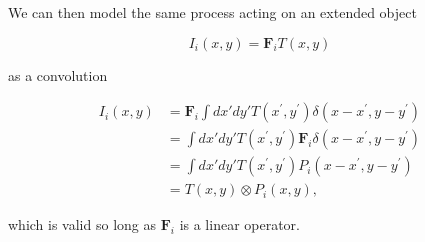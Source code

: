 \documentclass{openjournal}
\begin{document}
We can then model the same process acting on an extended object
\begin{linenomath}\begin{equation}
    I_i(x,y) = \mathbf{F}_i T(x,y)
\end{equation}\end{linenomath}
as a convolution
\begin{linenomath}\begin{align}
    I_i(x,y) &= \mathbf{F}_i \int dx' dy' T(x^\prime,y^\prime) \delta(x-x^\prime,y-y^\prime) \nonumber\\
    &= \int dx' dy' T(x^\prime,y^\prime) \mathbf{F}_i \delta(x-x^\prime,y-y^\prime) \nonumber\\
    &= \int dx' dy'  T(x^\prime,y^\prime) P_i(x-x^\prime,y-y^\prime) \nonumber\\
    &= T(x,y) \otimes P_i(x,y),
\end{align}\end{linenomath}
which is valid so long as $\mathbf{F}_i$ is a linear operator.
\end{document}
